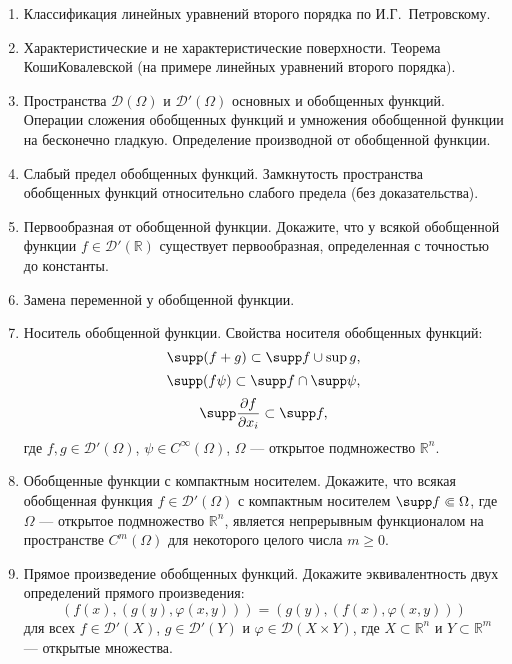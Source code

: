 \documentclass[unicode,12pt,draft]{article}
\begin{document}
\begin{enumerate}

\item
Классификация линейных уравнений второго порядка по
И.Г.~Петровскому.

\item
Характеристические и не характеристические поверхности. Теорема
Коши\ч Ковалевской (на примере линейных уравнений второго
порядка).

\item
Пространства ${\mathcal D} (\Omega)$ и ${\mathcal D}' (\Omega)$
основных и обобщенных функций. Операции сложения обобщенных
функций и умножения обобщенной функции на бесконечно гладкую.
Определение производной от обобщенной функции.

\item
Слабый предел обобщенных функций. Замкнутость пространства
обобщенных функций относительно слабого предела (без
доказательства).

\item
Первообразная от обобщенной функции. Докажите, что у всякой
обобщенной функции $f \in {\mathcal D}' ({\mathbb R})$ существует
первообразная, определенная с точностью до константы.


\item
Замена переменной у обобщенной функции.

\item
Носитель обобщенной функции. Свойства носителя обобщенных функций:
$$
    \supp (f + g)
    \subset
    \supp f \cup \sup g,
$$
$$
    \supp (f \psi)
    \subset
    \supp f \cap \supp \psi,
$$
$$
    \supp \frac{\partial f }{\partial x_i}
    \subset
    \supp f,
$$
где $f,g \in {\mathcal D}' (\Omega)$, $\psi \in C^\infty
(\Omega)$, $\Omega$ --- открытое подмножество ${\mathbb R}^n$.

\item
Обобщенные функции с компактным носителем. Докажите, что всякая
обобщенная функция $f \in {\mathcal D}' (\Omega)$ с компактным
носителем $\supp f \Subset \Omega$, где $\Omega$ --- открытое
подмножество ${\mathbb R}^n$, является непрерывным функционалом на
пространстве $C^m (\Omega)$ для некоторого целого числа $m \ge 0$.

\item
Прямое произведение обобщенных функций. Докажите эквивалентность
двух определений прямого произведения:
$$
    (f (x), (g (y), \varphi (x, y)))
    =
    (g (y), (f (x), \varphi (x, y)))
$$
для всех $f \in {\mathcal D}' (X)$, $g \in {\mathcal D}' (Y)$ и
$\varphi \in {\mathcal D} (X \times Y)$, где $X \subset {\mathbb
R}^n$ и $Y \subset {\mathbb R}^m$
--- открытые множества.


\end{enumerate}
\end{document}
